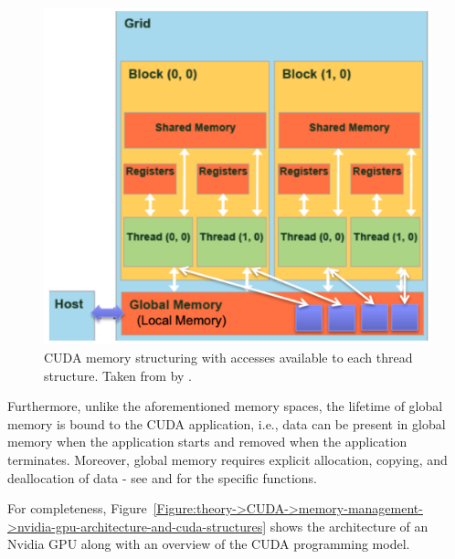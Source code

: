 \begin{figure}[ht!]
	\centering
	\includegraphics[width=12cm, keepaspectratio]{images/ch01/CUDA_memory_types_detailed.png}
	\caption{CUDA memory structuring with accesses available to each thread structure.
		Taken from  by  \cite{Hsiao17December2019}.
	}
	\label{Figure:theory->CUDA->memory-management->memory-spaces}
\end{figure}

Furthermore, unlike the aforementioned memory spaces, the lifetime of global memory is bound to the CUDA application, i.e., data can be present in global memory when the application starts and removed when the application terminates.
Moreover, global memory requires explicit allocation, copying, and deallocation of data - see  \cite{Cejka2022} and  \cite{NVIDIADecember2022} for the specific functions.

For completeness, Figure~\ref{Figure:theory->CUDA->memory-management->nvidia-gpu-architecture-and-cuda-structures} shows the architecture of an Nvidia GPU along with an overview of the CUDA programming model.

